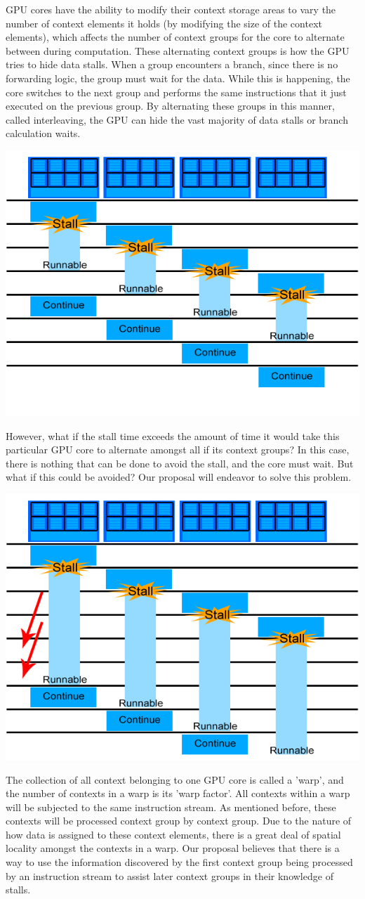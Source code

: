 \documentclass[conference]{IEEEtran}
\begin{document}
GPU cores have the ability to modify their context storage areas to vary the number of context elements it holds (by modifying the size of the context elements), which affects the number of context groups for the core to alternate between during computation.  These alternating context groups is how the GPU tries to hide data stalls.  When a group encounters a branch, since there is no forwarding logic, the group must wait for the data.  While this is happening, the core switches to the next group and performs the same instructions that it just executed on the previous group.  By alternating these groups in this manner, called interleaving, the GPU can hide the vast majority of data stalls or branch calculation waits.

\begin{center}
	\includegraphics[width=.45\textwidth]{GPU-context-interleaving.jpg}
\end{center}

However, what if the stall time exceeds the amount of time it would take this particular GPU core to alternate amongst all if its context groups?  In this case, there is nothing that can be done to avoid the stall, and the core must wait.  But what if this could be avoided?  Our proposal will endeavor to solve this problem.
\begin{center}
	\includegraphics[width=.45\textwidth]{GPU-context-interleaving-2.jpg}
\end{center}

The collection of all context belonging to one GPU core is called a 'warp', and the number of contexts in a warp is  its 'warp factor'.  All contexts within a warp will be subjected to the same instruction stream.  As mentioned before, these contexts will be processed context group by context group.  Due to the nature of how data is assigned to these context elements, there is a great deal of spatial locality amongst the contexts in a warp.  Our proposal believes that there is a way to use the information discovered by the first context group being processed by an instruction stream to assist later context groups in their knowledge of stalls.
\end{document}
